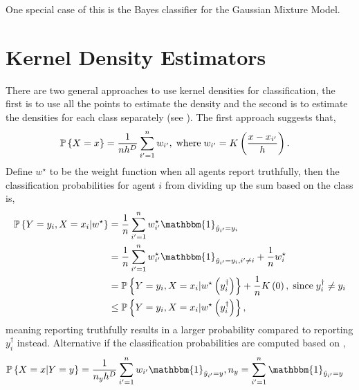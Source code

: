 \documentclass{article}
\begin{document}
One special case of this is the Bayes classifier for the Gaussian Mixture Model.
\newline \newline



\section{Kernel Density Estimators} 
There are two general approaches to use kernel densities for classification, the first is to use all the points to estimate the density and the second is to estimate the densities for each class separately (see \citet*{taylor1997classification}).
\newline \newline
The first approach suggests that,
\begin{align*}
\mathbb{P}\left\{X = x\right\} &= \dfrac{1}{n h^{D}} \displaystyle\sum_{i'=1}^{n} w_{i'}, \text{\;where\;} w_{i'} = K\left(\dfrac{x - x_{i'}}{h}\right).
\end{align*}
Define $w^\star $ to be the weight function when all agents report truthfully, then the classification probabilities for agent $i $ from dividing up the sum based on the class is,
\begin{align*}
\mathbb{P}\left\{Y = y_{i}, X = x_{i} | w^\star \right\} &= \dfrac{1}{n} \displaystyle\sum_{i'=1}^{n} w^\star _{i'} \mathbbm{1}_{\hat{y}_{i'} = y_{i}}
\\ &= \dfrac{1}{n} \displaystyle\sum_{i'=1}^{n} w^\star _{i'} \mathbbm{1}_{\hat{y}_{i'} = y_{i}, i' \neq  i} + \dfrac{1}{n} w^\star _{i}
\\ &= \mathbb{P}\left\{Y = y_{i}, X = x_{i} | w^\star \left(y^{\dagger}_{i}\right)\right\} + \dfrac{1}{n} K\left(0\right), \text{\;since\;} y^{\dagger}_{i} \neq  y_{i}
\\ &\leq  \mathbb{P}\left\{Y = y_{i}, X = x_{i} | w^\star \left(y^{\dagger}_{i}\right)\right\},
\end{align*}
meaning reporting truthfully results in a larger probability compared to reporting $y^{\dagger}_{i}$ instead.
\newline \newline
Alternative if the classification probabilities are computed based on \citet*{taylor1997classification},
\begin{align*}
\mathbb{P}\left\{X = x | Y = y\right\} &= \dfrac{1}{n_{y} h^{D}} \displaystyle\sum_{i'=1}^{n} w_{i'} \mathbbm{1}_{\hat{y}_{i'} = y}, n_{y} = \displaystyle\sum_{i'=1}^{n} \mathbbm{1}_{\hat{y}_{i'} = y}
\end{align*}
\end{document}
